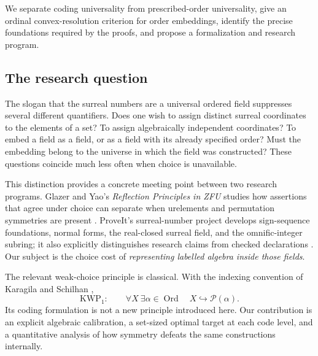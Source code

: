 \documentclass[11pt,letterpaper]{article}
\theoremstyle{definition}
\theoremstyle{remark}
\newcommand{\Ord}{\operatorname{Ord}}
\newcommand{\Pow}{\mathcal P}
\newcommand{\KWP}{\mathrm{KWP}}
\begin{document}
We separate coding universality from prescribed-order universality, give an ordinal convex-resolution criterion for order embeddings, identify the precise foundations required by the proofs, and propose a formalization and research program.

\subsection{The research question}
The slogan that the surreal numbers are a universal ordered field suppresses several different quantifiers. Does one wish to assign distinct surreal coordinates to the elements of a set? To assign algebraically independent coordinates? To embed a field as a field, or as a field with its already specified order? Must the embedding belong to the universe in which the field was constructed? These questions coincide much less often when choice is unavailable.

This distinction provides a concrete meeting point between two research programs. Glazer and Yao's \emph{Reflection Principles in ZFU} studies how assertions that agree under choice can separate when urelements and permutation symmetries are present \cite{GlazerYao}. ProveIt's surreal-number project develops sign-sequence foundations, normal forms, the real-closed surreal field, and the omnific-integer subring; it also explicitly distinguishes research claims from checked declarations \cite{ProveItSurreal}. Our subject is the choice cost of \emph{representing labelled algebra inside those fields}.

The relevant weak-choice principle is classical. With the indexing convention of Karagila and Schilhan \cite{KaragilaSchilhan},
\begin{equation}\label{hset:kw:eq:kwp}
\KWP_1:\qquad
\forall X\ \exists\alpha\in\Ord\quad X\hookrightarrow\Pow(\alpha).
\end{equation}
Its coding formulation is not a new principle introduced here. Our contribution is an explicit algebraic calibration, a set-sized optimal target at each code level, and a quantitative analysis of how symmetry defeats the same constructions internally.
\end{document}
